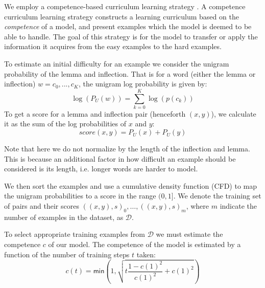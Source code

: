 \documentclass[11pt,a4paper]{article}
\begin{document}
We employ a competence-based curriculum learning strategy
\cite{DBLP:conf/acl/LiuLWC20, platanios2019competence}. A competence
curriculum learning strategy constructs a learning curriculum based on
the \textit{competence} of a model, and present examples which the
model is deemed to be able to handle. The goal of this
strategy is for the model to transfer or apply the information it
acquires from the easy examples to the hard examples.
 
To estimate an initial difficulty for an example we consider the
unigram probability of the lemma and inflection. That is for a word
(either the lemma or inflection) $w = c_0, ..., c_K$, the unigram log
probability is given by:
%
\begin{equation}
    \log (P_U(w)) = \sum_{k=0}^{K} \log(p(c_k))
\end{equation}
%
To get a score for a lemma and inflection pair (henceforth $(x,y)$),
we calculate it as the sum of the log probabilities of $x$ and $y$:
%
\begin{equation}
    score(x,y) = P_U(x) + P_U(y)
\end{equation}

Note that here we do not normalize by the length of the inflection and
lemma. This is because an additional factor in how difficult an
example should be considered is its length, i.e. longer words are
harder to model.

We then sort the examples and use a cumulative density function (CFD)
to map the unigram probabilities to a score in the range $(0, 1]$. We
denote the training set of pairs and their scores
$((x,y), s)_0, \ldots, ((x,y), s)_m$, where $m$ indicate the number of
examples in the dataset, as $\mathcal{D}$.

% 
%
To select appropriate training examples from $\mathcal{D}$ we must
estimate the competence $c$ of our model. The competence of the model
is estimated by a function of the number of training steps $t$ taken:
%
%
%
\begin{equation}
    c(t) = \mathsf{min}\left(1, \sqrt{t\frac{1-c(1)^2}{c(1)^2}+c(1)^2}\right)
\end{equation}
\end{document}
